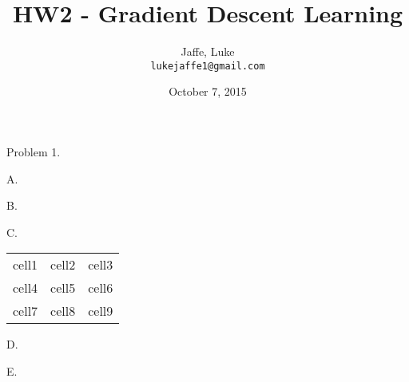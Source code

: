 \documentclass[a4paper,12pt]{article}
\begin{document}
\title{\textbf{HW2 - Gradient Descent Learning}}
\author{
    Jaffe, Luke\\
    \texttt{lukejaffe1@gmail.com}}
\date{October 7, 2015}
\maketitle

Problem 1. \newline

A.

B.

C.

\begin{center}
\begin{tabular}{ c c c }
 cell1 & cell2 & cell3 \\ 
 cell4 & cell5 & cell6 \\  
 cell7 & cell8 & cell9    
\end{tabular}
\end{center}

D.

E.
\end{document}
